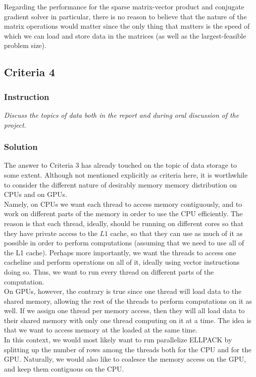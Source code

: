 \documentclass[10pt]{article}
\begin{document}
Regarding the performance for the sparse matrix-vector product and conjugate gradient solver in particular, there is no reason to believe that the nature of the matrix operations would matter since the only thing that matters is the speed of which we can load and store data in the matrices (as well as the largest-feasible problem size).  
\subsection{Criteria 4}
\subsubsection{Instruction}
\textit{Discuss the topics of data both in the report and during oral discussion of the project.}
\subsubsection{Solution}
The answer to Criteria 3 has already touched on the topic of data storage to some extent. Although not mentioned explicitly as criteria here, it is worthwhile to consider the different nature of desirably memory memory distribution on CPUs and on GPUs. \\

Namely, on CPUs we want each thread to access memory contiguously, and to work on different parts of the memory in order to use the CPU efficiently. The reason is that each thread, ideally, should be running on different cores so that they have private access to the $L1$ cache, so that they can use as much of it as possible in order to perform computations (assuming that we need to use all of the L1 cache). Perhaps more importantly, we want the threads to access one cacheline and perform operations on all of it, ideally using vector instructions doing so. Thus, we want to run every thread on different parts of the computation. \\

On GPUs, however, the contrary is true since one thread will load data to the shared memory, allowing the rest of the threads to perform computations on it as well. If we assign one thread per memory access, then they will all load data to their shared memory with only one thread computing on it at a time. The idea is that we want to access memory at the loaded at the same time. \\

In this context, we would most likely want to run parallelize ELLPACK by splitting up the number of rows among the threads both for the CPU and for the GPU. Naturally, we would also like to coalesce the memory access on the GPU, and keep them contiguous on the CPU. \\
\end{document}
